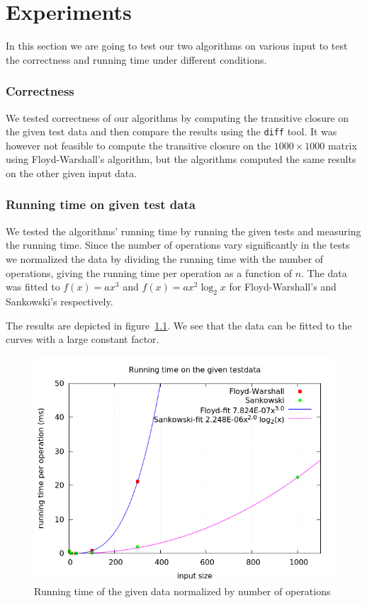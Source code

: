 \documentclass[a4paper,oneside,article,11pt]{memoir}
\begin{document}
\chapter{Experiments}
\label{chap:exp}
In this section we are going to test our two algorithms on various input to test the correctness and running time under different conditions.

\subsection{Correctness}
We tested correctness of our algorithms by computing the transitive closure on the given test data and then compare the results using the \texttt{diff} tool. It was however not feasible to compute the transitive closure on the $1000 \times 1000$ matrix using Floyd-Warshall's algorithm, but the algorithms computed the same results on the other given input data.

\subsection{Running time on given test data}
We tested the algorithms' running time by running the given tests and measuring the running time. Since the number of operations vary significantly in the tests we normalized the data by dividing the running time with the number of operations, giving the running time per operation as a function of $n$. The data was fitted to $f(x) = ax^3$ and $f(x)=ax^2\log_2 x$ for Floyd-Warshall's and Sankowski's respectively.

The results are depicted in figure~\ref{fig:norm-run-comb}. We see that the data can be fitted to the curves with a large constant factor.
\begin{figure}[ht]
\includegraphics[width=\textwidth]{images/normalized-given-data-running.png}
\caption{Running time of the given data normalized by number of operations}
\label{fig:norm-run-comb}
\end{figure}
\end{document}
